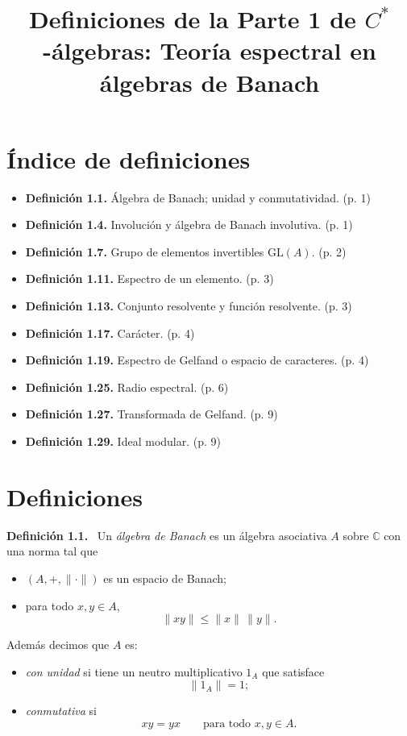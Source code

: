 \documentclass[11pt]{article}
\title{Definiciones de la Parte 1 de $C^*$-álgebras: Teoría espectral en álgebras de Banach}
\author{}
\date{}
\newcommand{\GL}{\mathrm{GL}}
\newenvironment{definicion}[1]
  {\par\medskip\noindent\textbf{Definición #1.}\ }
  {\par\medskip}
\begin{document}
\maketitle

\section*{Índice de definiciones}
\begin{itemize}[leftmargin=*]
  \item \textbf{Definición 1.1.} Álgebra de Banach; unidad y conmutatividad. \hfill (p. 1)
  \item \textbf{Definición 1.4.} Involución y álgebra de Banach involutiva. \hfill (p. 1)
  \item \textbf{Definición 1.7.} Grupo de elementos invertibles $\GL(A)$. \hfill (p. 2)
  \item \textbf{Definición 1.11.} Espectro de un elemento. \hfill (p. 3)
  \item \textbf{Definición 1.13.} Conjunto resolvente y función resolvente. \hfill (p. 3)
  \item \textbf{Definición 1.17.} Carácter. \hfill (p. 4)
  \item \textbf{Definición 1.19.} Espectro de Gelfand o espacio de caracteres. \hfill (p. 4)
  \item \textbf{Definición 1.25.} Radio espectral. \hfill (p. 6)
  \item \textbf{Definición 1.27.} Transformada de Gelfand. \hfill (p. 9)
  \item \textbf{Definición 1.29.} Ideal modular. \hfill (p. 9)
\end{itemize}

\section*{Definiciones}

\begin{definicion}{1.1}
Un \emph{álgebra de Banach} es un álgebra asociativa $A$ sobre $\mathbb{C}$ con una norma tal que
\begin{itemize}[leftmargin=2em]
  \item $(A,+,\lVert\cdot\rVert)$ es un espacio de Banach;
  \item para todo $x,y\in A$,
  \[
    \lVert xy\rVert\leq \lVert x\rVert\,\lVert y\rVert.
  \]
\end{itemize}
Además decimos que $A$ es:
\begin{itemize}[leftmargin=2em]
  \item \emph{con unidad} si tiene un neutro multiplicativo $1_A$ que satisface
  \[
    \lVert 1_A\rVert=1;
  \]
  \item \emph{conmutativa} si
  \[
    xy=yx
    \qquad\text{para todo }x,y\in A.
  \]
\end{itemize}
\end{definicion}
\end{document}
